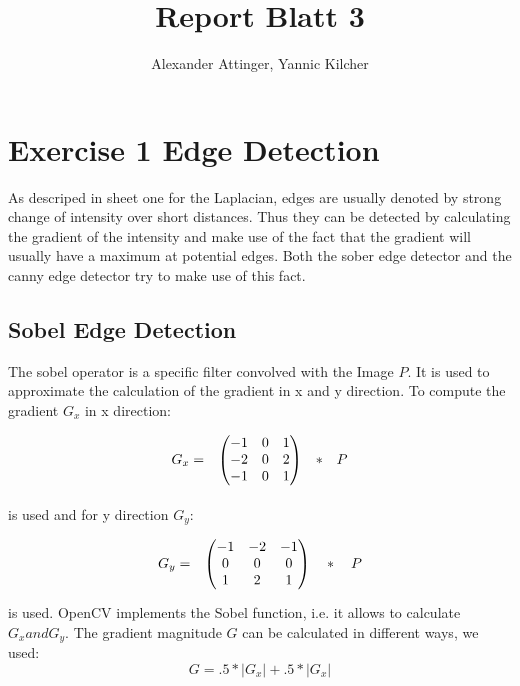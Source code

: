 \documentclass[11pt,a4paper]{article}
\author{Alexander Attinger, Yannic Kilcher}
\title{Report Blatt 3}
\begin{document}
\maketitle
\section{Exercise 1 Edge Detection}
As descriped in sheet one for the Laplacian, edges are usually denoted by strong change of intensity over short distances. Thus they can be detected by calculating the gradient of the intensity and make use of the fact that the gradient will usually have a maximum at potential edges. Both the sober edge detector and the canny edge detector try to make use of this fact. 

\subsection{Sobel Edge Detection}
The sobel operator is a specific filter convolved with the Image $P$. It is used to approximate the calculation of the gradient in x and y direction. To compute the gradient $G_{x}$ in x direction:

\[
\begin{array}{lcc}
G_{x} = & \left(\begin{array}{@{}ccc@{}}
                    -1 & 0 & 1 \\
                    -2 & 0 & 2 \\
                    -1 & 0 & 1
                  \end{array}\right) & *\quad P\\[15pt]
  
\end{array} 
\]

is used and for y direction $G_{y}$:

\[
\begin{array}{lcc}
G_{y} = & \left(\begin{array}{@{}ccc@{}}
                    -1 & -2 & -1 \\
                    0 & 0 & 0 \\
                    1 & 2 & 1
                  \end{array}\right)\quad *\quad P\\[15pt]
  
\end{array}
\]
 is used. OpenCV implements the Sobel function, i.e. it allows to calculate $G_{x} and G_{y}$. The gradient magnitude $G$ can be calculated in different ways, we used:
 \begin{equation}
 G = .5*\lvert G_{x} \rvert +.5*\lvert G_{x}\rvert
 \end{equation}
 
\end{document}
